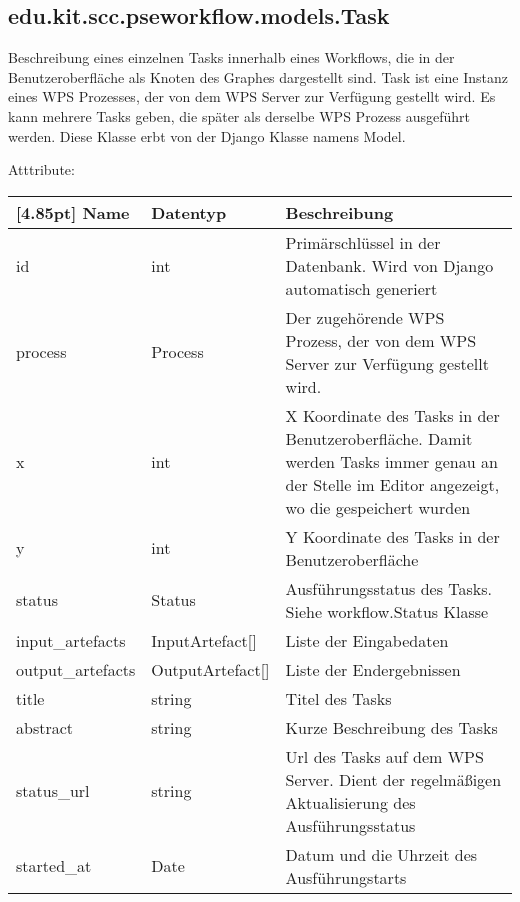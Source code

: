         \subsection{edu.kit.scc.pseworkflow.models.Task}	
    		Beschreibung eines einzelnen Tasks innerhalb eines Workflows, die in der Benutzeroberfläche als Knoten des Graphes dargestellt sind. Task ist eine Instanz eines WPS Prozesses, der von dem WPS Server zur Verfügung gestellt wird. Es kann mehrere Tasks geben, die später als derselbe WPS Prozess ausgeführt werden. \newline
    		Diese Klasse erbt von der Django Klasse namens \glqq Model\grqq .
    		
    		Atttribute:
			\begin{center}
				\setlength\tabcolsep{5pt}
				\renewcommand{\arraystretch}{1.5}
				
				\begin{tabularx}{\textwidth}{|l|l|X|}
					\hline
					\rowcolor[gray]{0.75}[4.85pt]
					Name & Datentyp & Beschreibung \\ \hline 
	           		id & int & Primärschlüssel in der Datenbank. Wird von Django automatisch generiert \\ \hline
	           		process & Process & Der zugehörende WPS Prozess, der von dem WPS Server zur Verfügung gestellt wird. \\\hline
	           		x & int & X Koordinate des Tasks in der Benutzeroberfläche. Damit werden Tasks immer genau an der Stelle im Editor angezeigt, wo die gespeichert wurden\\ \hline
	           		y & int & Y Koordinate des Tasks in der Benutzeroberfläche\\ \hline
	           		status & Status & Ausführungsstatus des Tasks. Siehe workflow.Status Klasse \\ \hline
	           		input\_artefacts & InputArtefact[] & Liste der Eingabedaten \\ \hline
	           		output\_artefacts & OutputArtefact[] & Liste der Endergebnissen \\ \hline
	           		title & string & Titel des Tasks \\ \hline
	           		abstract & string & Kurze Beschreibung des Tasks \\ \hline
	           		status\_url & string & Url des Tasks auf dem WPS Server. Dient der  regelmäßigen Aktualisierung des Ausführungsstatus \\ \hline
	           		started\_at & Date & Datum und die Uhrzeit des Ausführungstarts \\ \hline
				\end{tabularx}
			\end{center}
    			
